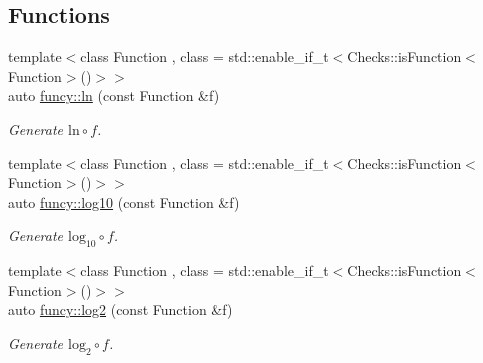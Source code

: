 \subsection*{Functions}
\begin{DoxyCompactItemize}
\item 
{\footnotesize template$<$class Function , class  = std\-::enable\-\_\-if\-\_\-t$<$\-Checks\-::is\-Function$<$\-Function$>$()$>$$>$ }\\auto \hyperlink{group__CMathGroup_gaa1ca40e2b0c36709978b91836435b0c5}{funcy\-::ln} (const Function \&f)
\begin{DoxyCompactList}\small\item\em Generate $ \mathrm{ln}\circ f $. \end{DoxyCompactList}\item 
{\footnotesize template$<$class Function , class  = std\-::enable\-\_\-if\-\_\-t$<$\-Checks\-::is\-Function$<$\-Function$>$()$>$$>$ }\\auto \hyperlink{group__CMathGroup_ga29cb2c4b2fb13040a351e685fc3f8b03}{funcy\-::log10} (const Function \&f)
\begin{DoxyCompactList}\small\item\em Generate $ \mathrm{log}_{10}\circ f $. \end{DoxyCompactList}\item 
{\footnotesize template$<$class Function , class  = std\-::enable\-\_\-if\-\_\-t$<$\-Checks\-::is\-Function$<$\-Function$>$()$>$$>$ }\\auto \hyperlink{group__CMathGroup_gab619c71bd55d049c827d8f2af2a939d3}{funcy\-::log2} (const Function \&f)
\begin{DoxyCompactList}\small\item\em Generate $ \mathrm{log}_{2}\circ f $. \end{DoxyCompactList}\end{DoxyCompactItemize}
